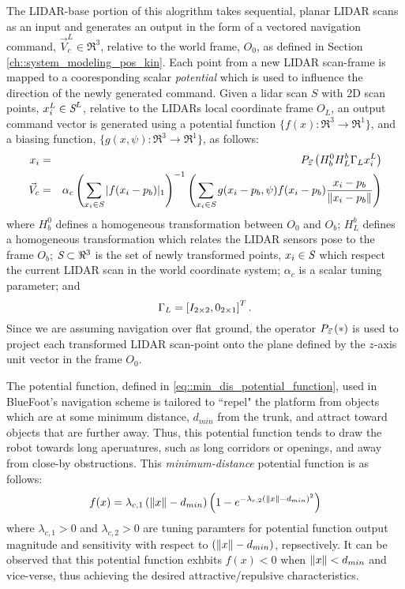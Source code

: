 		The LIDAR-base portion of this alogrithm takes sequential, planar LIDAR scans as an input and generates an output in the form of a vectored navigation command, $\vec{V}_{c}^{L}\in \Re^{3}$, relative to the world frame, $O_{0}$, as defined in Section \ref{ch::system_modeling_pos_kin}. Each point from a new LIDAR scan-frame is mapped to a cooresponding scalar \emph{potential} which is used to influence the direction of the newly generated command. Given a lidar scan $S$ with 2D scan points, $x_{i}^{L}\in\emph{S}^{L}$, relative to the LIDARs local coordinate frame $O_{L}$, an output command vector is generated using a potential function $\{ f(x) : \Re^{3}\rightarrow \Re^{1} \}$, and a biasing function, $\{ g(x,\psi) : \Re^{3}\rightarrow \Re^{1} \}$, as follows:
%
	\begin{eqnarray}
	x_{i}  &=& P_{ \vec{z} } \left( H_{b}^{0} H_{L}^{b} \Gamma_{L} x_{i}^{L} \right) \nonumber \\
	\vec{V}_{c} &=& \alpha_{c} \left(\sum_{x_{i}\in \emph{S}} |f( x_{i}-p_{b})|_{1}\right)^{-1}  \left( \sum_{x_{i} \in \emph{S}} g( x_{i}-p_{b},\psi)  f( x_{i}-p_{b} ) \frac{x_{i}-p_{b}}{\left\lVert x_{i}-p_{b}\right\rVert} \right)
	\end{eqnarray}
	where $H_{b}^{0}$ defines a homogeneous transformation between $O_{0}$ and $O_{b}$; $H_{L}^{b}$ defines a homogeneous transformation which relates the LIDAR sensors pose to the frame $O_{b}$; $\emph{S}\subset \Re^{3}$ is the set of newly transformed points, $x_{i} \in \emph{S}$ which respect the current LIDAR scan in the world coordinate system; $\alpha_{c}$ is a scalar tuning parameter; and 
	\begin{equation*}
		\Gamma_{L} = \left[ I_{2\times2}, 0_{2\times1} \right]^{T}.
	\end{equation*}
Since we are assuming navigation over flat ground, the operator $P_{ \vec{z} }\left(*\right)$ is used to project each transformed LIDAR scan-point onto the plane defined by the $z$-axis unit vector in the frame $O_{0}$.

The potential function, defined in \ref{eq::min_dis_potential_function}, used in BlueFoot's navigation scheme is tailored to ``repel" the platform from objects which are at some minimum distance, $d_{min}$ from the trunk, and attract toward objects that are further away. Thus, this potential function tends to draw the robot towards long aperuatures, such as long corridors or openings, and away from close-by obstructions. This \emph{minimum-distance} potential function is as follows:
	\begin{equation}
		f(x) = \lambda_{c,1}\left(\left\lVert x\right\rVert-d_{min}\right) \left( 1  - e^{ -  \lambda_{c,2} { \left(\left\lVert x\right\rVert-d_{min}\right) }^{2} } \right)
	\label{eq::min_dis_potential_function}
	\end{equation}
where $\lambda_{c,1}>0$ and $\lambda_{c,2}>0$ are tuning paramters for potential function output magnitude and sensitivity with respect to $\left(\left\lVert x\right\rVert-d_{min}\right)$, repsectively. It can be observed that this potential function exhbits $f(x)<0$ when $\left\lVert x\right\rVert < d_{min}$ and vice-verse, thus achieving the desired attractive/repulsive characteristics.

